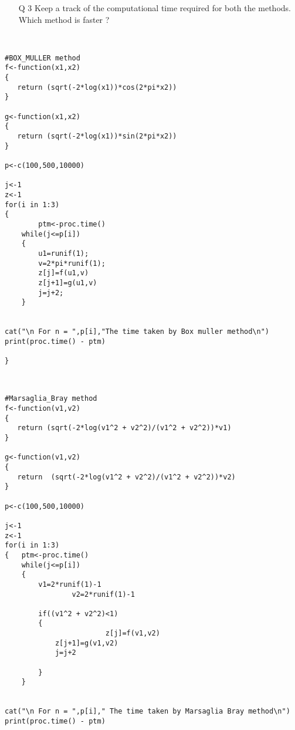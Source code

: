\documentclass[11pt]{article}
\begin{document}
{{{{ \begin{figure}[H]
  \centering
 \end{figure}
 
 \begin{figure}[H]
  \centering
 \end{figure}
 
 



\newpage


\begin{enumerate}
\item[Q 3] Keep a track of the computational time required for both the methods. Which method
is faster ?
\end{enumerate}

\\
\begin{lstlisting}
#BOX_MULLER method
f<-function(x1,x2)
{
   return (sqrt(-2*log(x1))*cos(2*pi*x2))
}

g<-function(x1,x2)
{
   return (sqrt(-2*log(x1))*sin(2*pi*x2))
}

p<-c(100,500,10000)

j<-1
z<-1
for(i in 1:3)
{
        ptm<-proc.time()	
	while(j<=p[i])
	{
		u1=runif(1);
		v=2*pi*runif(1);
  		z[j]=f(u1,v)
 		z[j+1]=g(u1,v)
 		j=j+2;	
	}


cat("\n For n = ",p[i],"The time taken by Box muller method\n")
print(proc.time() - ptm)
	
}

\end{lstlisting}
\newpage
{}\\
\begin{lstlisting}
#Marsaglia_Bray method
f<-function(v1,v2)
{
   return (sqrt(-2*log(v1^2 + v2^2)/(v1^2 + v2^2))*v1)
}

g<-function(v1,v2)
{
   return  (sqrt(-2*log(v1^2 + v2^2)/(v1^2 + v2^2))*v2)
}

p<-c(100,500,10000)

j<-1
z<-1
for(i in 1:3)
{	ptm<-proc.time()
	while(j<=p[i])
	{
		v1=2*runif(1)-1
                v2=2*runif(1)-1
		
		if((v1^2 + v2^2)<1)
		{
                        z[j]=f(v1,v2)
			z[j+1]=g(v1,v2)
			j=j+2

		}	
	}


cat("\n For n = ",p[i]," The time taken by Marsaglia Bray method\n")
print(proc.time() - ptm)
		

\end{lstlisting}}}}}
\end{document}
